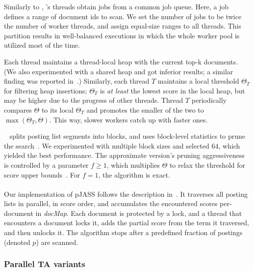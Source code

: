{Similarly to \alg, \pBMW's threads obtain jobs from a common job queue. Here, a job defines a range of document ids to scan. 
We set the number of jobs to be twice the number of worker threads, and assign equal-size ranges to all threads.  
This partition results in well-balanced executions in which the whole worker pool is utilized 
most of the time. 

Each thread maintains a thread-local heap with the current top-k documents. (We also experimented with a shared heap and 
got inferior results; a similar finding was reported in~\cite{rojas2013distributing}.)
Similarly, each thread $T$ maintains a local threshold $\Theta_T$ for filtering heap insertions; 
$\Theta_T$ is \emph{at least} the lowest score in the local heap, but may be higher due to the progress of other threads.  
Thread $T$ periodically compares $\Theta$ to its local $\Theta_T$ and promotes the smaller of the two to $\max(\Theta_T, \Theta)$. 
This way,  slower workers catch up with  faster ones.

\pBMW\
splits posting list segments into blocks, and uses block-level
statistics to prune the search~\cite{Ding:2011}. We experimented with multiple block sizes and selected $64$, 
which yielded the best performance.
The approximate version's pruning aggressiveness is  controlled by  a parameter 
$f \geq 1$, which multiplies $\Theta$ to relax the threshold for score upper bounds~\cite{Broder:2003}. For $f=1$, the algorithm is exact.

\paragraph{\pJASS}
Our implementation of pJASS  follows the description in~\cite{parallel-jass}. It traverses all posting lists in parallel, in score order, and accumulates the encountered scores 
per-document in  \emph{docMap}. Each document is protected by a lock, and a thread that encounters a document locks it, adds the partial score from the term it traversed, and then unlocks it.
The algorithm stops after a predefined fraction of postings (denoted $p$) are scanned.

\subsubsection{Parallel TA variants}

}
